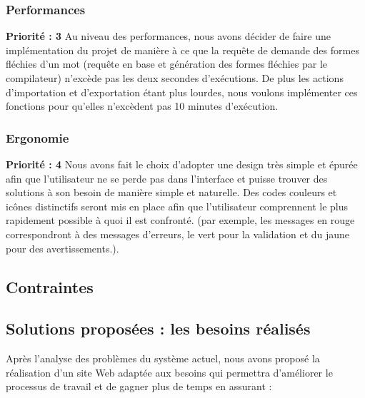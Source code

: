 \documentclass[12pt,a4paper]{article}
\begin{document}
\subsubsection{Performances}
\textbf{Priorité : 3}
\smallbreak
Au niveau des performances, nous avons décider de faire une implémentation du projet de manière à ce que la requête de demande des formes fléchies d'un mot (requête en base et génération des formes fléchies par le compilateur) n'excède pas les deux secondes d'exécutions. De plus les actions d'importation et d'exportation étant plus lourdes, nous voulons implémenter ces fonctions pour qu'elles n'excèdent pas 10 minutes d'exécution.

\subsubsection{Ergonomie}
\textbf{Priorité : 4}
\smallbreak
Nous avons fait le choix d'adopter une design très simple et épurée afin que l'utilisateur ne se perde pas dans l'interface et puisse trouver des solutions à son besoin de manière simple et naturelle.
\smallbreak
Des codes couleurs et icônes distinctifs seront mis en place afin que l'utilisateur comprennent le plus rapidement possible à quoi il est confronté. (par exemple, les messages en rouge correspondront à des messages d'erreurs, le vert pour la validation et du jaune pour des avertissements.).

\subsection{Contraintes}
\subsection{Solutions proposées : les besoins réalisés}

Après l'analyse des problèmes du système actuel, nous avons proposé la réalisation d'un site Web  adaptée aux besoins 
qui permettra d'améliorer le processus de travail et de gagner plus de temps en assurant :
\end{document}
